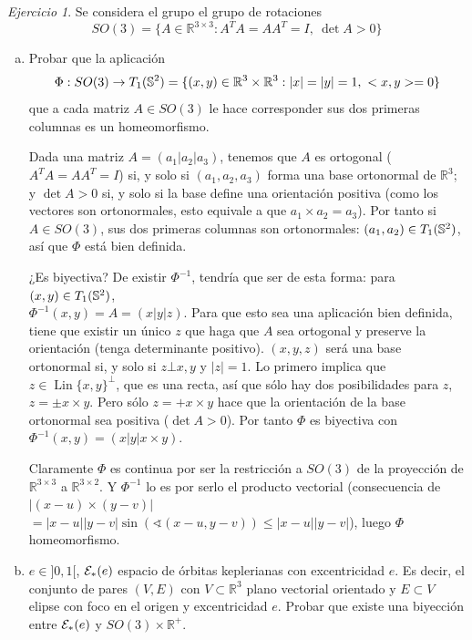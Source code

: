 \documentclass[12pt,spanish]{article}
\theoremstyle{definition}
\theoremstyle{remark}
\newtheorem{exercise}{Ejercicio}
\newcommand{\R}{\mathbb{R}}
\begin{document}
\begin{exercise}

  Se considera el grupo el grupo de rotaciones
  \[SO(3)=\{A\in\R^{3\times 3}:A^T A=AA^T=I,\ \det A>0\}\]

  \begin{enumerate}[a)]
  \item Probar que la aplicación
    \[\Phi:SO(3)\rightarrow \T=\{(x,y)\in\R^3\times\R^3:|x|=|y|=1,\
      <x,y>=0\}\] que a cada matriz $A\in SO(3)$ le hace corresponder
    sus dos primeras columnas es un homeomorfismo.

    Dada una matriz $A=(a_1|a_2|a_3)$, tenemos que $A$ es ortogonal
    ($A^T A=AA^T=I$) si, y solo si $(a_1,a_2,a_3)$ forma una base
    ortonormal de $\R^3$; y $\det A>0$ si, y solo si la base define
    una orientación positiva (como los vectores son ortonormales, esto
    equivale a que $a_1\times a_2=a_3$). Por tanto si $A\in SO(3)$,
    sus dos primeras columnas son ortonormales: $(a_1,a_2)\in T_1(\mathbb{S}^2)$, así
    que $\Phi$ está bien definida.

    ¿Es biyectiva? De existir $\Phi^{-1}$, tendría que ser de esta
    forma: para $(x,y)\in T_1(\mathbb{S}^2)$, \\ $\Phi^{-1}(x,y)=A=(x|y|z)$. Para que
    esto sea una aplicación bien definida, tiene que existir un único
    $z$ que haga que $A$ sea ortogonal y preserve la orientación
    (tenga determinante positivo). $(x,y,z)$ será una base ortonormal
    si, y solo si $z\bot x,y$ y $|z|=1$. Lo primero implica que
    $z\in \operatorname{Lin}\{x,y\}^\bot$, que es una recta, así que
    sólo hay dos posibilidades para $z$, $z=\pm x\times y$. Pero sólo
    $z=+x\times y$ hace que la orientación de la base ortonormal
    sea positiva ($\det A>0$). Por tanto $\Phi$ es biyectiva con \\
    $\Phi^{-1}(x,y)=(x|y|x\times y)$.

    Claramente $\Phi$ es continua por ser la restricción a $SO(3)$ de
    la proyección de $\R^{3\times 3}$ a $\R^{3\times 2}$. Y
    $\Phi^{-1}$ lo es por serlo el producto vectorial (consecuencia de
    $|(x-u)\times (y-v)|$\\
    $=|x-u||y-v|\sin(\sphericalangle(x-u,y-v))\leq |x-u||y-v|$), luego
    $\Phi$ homeomorfismo.

  \item $e\in]0,1[$, $\mathcal{E}_*(e)$ espacio de órbitas keplerianas con
    excentricidad $e$. Es decir, el conjunto de pares $(V,E)$ con
    $V\subset\R^3$ plano vectorial orientado y $E\subset V$ elipse con
    foco en el origen y excentricidad $e$. Probar que existe una
    biyección entre $\mathcal{E}_*(e)$ y $SO(3)\times\R^+$.


\end{enumerate}
\end{exercise}
\end{document}
